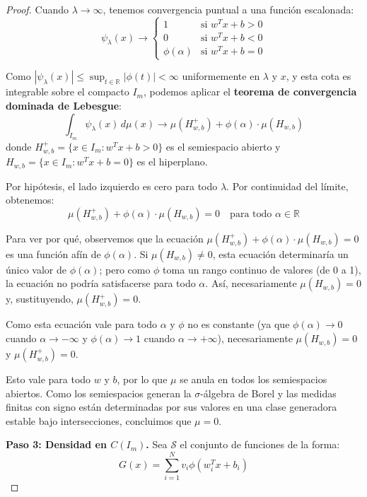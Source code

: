 \begin{proof}
	Cuando \(\lambda \to \infty\), tenemos convergencia puntual a una función escalonada:
	\[
		\psi_{\lambda}(x) \to \begin{cases}
			                        1 & \text{si } w^T x + b > 0 \\
			                        0 & \text{si } w^T x + b < 0 \\
			                        \phi(\alpha) & \text{si } w^T x + b = 0
		\end{cases}
	\]

	Como \(|\psi_{\lambda}(x)| \leq \sup_{t \in \mathbb{R}} |\phi(t)| < \infty\) uniformemente en \(\lambda\) y \(x\), y esta cota es integrable sobre el compacto \(I_m\), podemos aplicar el \textbf{teorema de convergencia dominada de Lebesgue}:
	\[
		\int_{I_m} \psi_{\lambda}(x) \, d\mu(x) \to \mu(H^+_{w,b}) + \phi(\alpha) \cdot \mu(H_{w,b})
	\]
	donde \(H^+_{w,b} = \{x \in I_m : w^T x + b > 0\}\) es el semiespacio abierto y \(H_{w,b} = \{x \in I_m : w^T x + b = 0\}\) es el hiperplano.

	Por hipótesis, el lado izquierdo es cero para todo \(\lambda\). Por continuidad del límite, obtenemos:
	\[
		\mu(H^+_{w,b}) + \phi(\alpha) \cdot \mu(H_{w,b}) = 0 \quad \text{para todo } \alpha \in \mathbb{R}
	\]

	Para ver por qué, observemos que la ecuación \(\mu(H^+_{w,b}) + \phi(\alpha) \cdot \mu(H_{w,b}) = 0\) es una función afín de \(\phi(\alpha)\). Si \(\mu(H_{w,b}) \neq 0\), esta ecuación determinaría un único valor de \(\phi(\alpha)\); pero como \(\phi\) toma un rango continuo de valores (de 0 a 1), la ecuación no podría satisfacerse para todo \(\alpha\). Así, necesariamente \(\mu(H_{w,b}) = 0\) y, sustituyendo, \(\mu(H^+_{w,b}) = 0\).

	Como esta ecuación vale para todo \(\alpha\) y \(\phi\) no es constante (ya que \(\phi(\alpha) \to 0\) cuando \(\alpha \to -\infty\) y \(\phi(\alpha) \to 1\) cuando \(\alpha \to +\infty\)), necesariamente \(\mu(H_{w,b}) = 0\) y \(\mu(H^+_{w,b}) = 0\).

	Esto vale para todo \(w\) y \(b\), por lo que \(\mu\) se anula en todos los semiespacios abiertos. Como los semiespacios generan la \(\sigma\)-álgebra de Borel y las medidas finitas con signo están determinadas por sus valores en una clase generadora estable bajo intersecciones, concluimos que \(\mu = 0\).

	\textbf{Paso 3: Densidad en \(C(I_m)\).}
	Sea \(\mathcal{S}\) el conjunto de funciones de la forma:
	\[
		G(x) = \sum_{i=1}^{N} v_i \phi(w_i^T x + b_i)
	\]


\end{proof}
